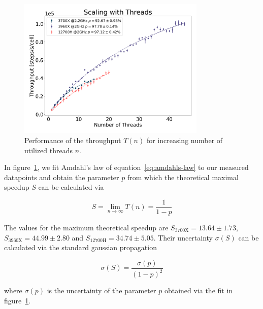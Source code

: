 \documentclass[a4paper]{article}
\begin{document}
\begin{figure}
    \centering
    \includegraphics[width=0.8\textwidth]{figures/benchmarks/thread_scaling.png}
    \caption{Performance of the throughput $T(n)$ for increasing number of utilized threads $n$.}
    \label{fig:amdahls-law-fit}
\end{figure}

In figure~\ref{fig:amdahls-law-fit}, we fit Amdahl's law of equation~\ref{eq:amdahls-law} to our
measured datapoints and obtain the parameter $p$ from which the theoretical maximal speedup $S$ can
be calculated via

\begin{equation}
    S = \lim\limits_{n\rightarrow\infty} T(n) = \frac{1}{1-p}
    \label{eq:amdahls-law-maximum-speedup}
\end{equation}

The values for the maximum theoretical speedup are $S_\text{3700X}=13.64\pm1.73$,
$S_\text{3960X}=44.99\pm2.80$ and $S_\text{12700H}=34.74\pm5.05$.
Their uncertainty $\sigma(S)$ can be calculated via the standard gaussian propagation

\begin{equation}
    \sigma(S) = \frac{\sigma(p)}{(1-p)^2}
\end{equation}

where $\sigma(p)$ is the uncertainty of the parameter $p$ obtained via the fit in
figure~\ref{fig:amdahls-law-fit}.
\end{document}
